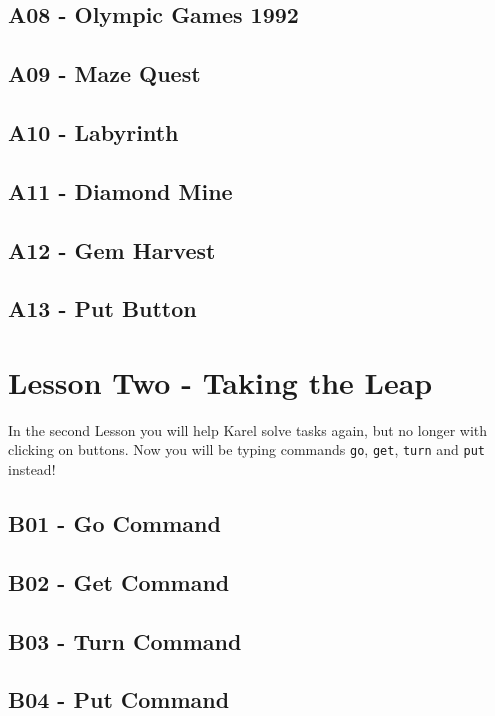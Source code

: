 \documentclass[article,A4,12pt]{llncs}
\begin{document}
\subsection{A08 - Olympic Games 1992}

\subsection{A09 - Maze Quest}

\subsection{A10 - Labyrinth}

\subsection{A11 - Diamond Mine}

\subsection{A12 - Gem Harvest}

\subsection{A13 - Put Button}

\section{Lesson Two - Taking the Leap}

In the second Lesson you will help Karel solve tasks again,
but no longer with clicking on buttons. Now you will be 
typing commands {\tt go}, {\tt get}, {\tt turn} and {\tt put} 
instead!

\subsection{B01 - Go Command}

\subsection{B02 - Get Command}

\subsection{B03 - Turn Command}

\subsection{B04 - Put Command}
\end{document}
